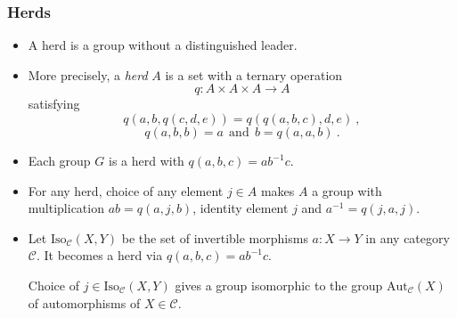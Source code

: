 \documentclass{beamer}
\newcommand{\lra}{\longrightarrow}
\def\CC{{\mathscr C}}
\begin{document}
\begin{frame}
  \frametitle{Herds}

 \begin{itemize}
\item A herd is a group without a distinguished leader. 
\pause
\item More precisely, a {\em herd} $A$ is a set with a ternary operation 
$$q : A\times A \times A \lra A$$ 
satisfying $$q(a,b,q(c,d,e))=q(q(a,b,c),d,e) \ ,$$
$$q(a,b,b) = a \ \ \text{and} \ \  b = q(a,a,b)\ .$$
\pause
\item Each group $G$ is a herd with $q(a,b,c)=ab^{-1}c$.
\pause
\item For any herd, choice of any element $j\in A$ makes $A$ a group with
multiplication $ab = q(a,j,b)$, identity element $j$ and $a^{-1}=q(j,a,j)$.
\pause
\item Let $\mathrm{Iso}_{\CC}(X,Y)$ be the set of invertible morphisms 
$a : X\lra Y$ in any category $\CC$. It becomes a herd via $q(a,b,c)=ab^{-1}c$.

Choice of $j\in \mathrm{Iso}_{\CC}(X,Y)$ gives a group isomorphic to the group
$\mathrm{Aut}_{\CC}(X)$ of automorphisms of $X\in \CC$. 
\end{itemize}
\end{frame}
\end{document}
